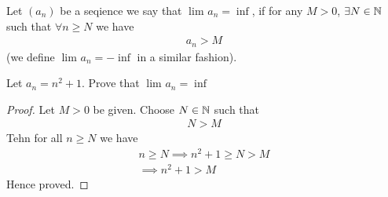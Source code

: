 \begin{definition}
	Let $\left( a_n \right) $ be a seqience we say that $\lim_{} a_n = \inf$, if for any $M > 0$, $\exists N \in  \mathbb{N}$ such that $\forall n \ge N$ we have
	\begin{align}
		a_n > M
	\end{align}
	(we define $\lim_{} a_n = -\inf$ in a similar fashion).
\end{definition}

\begin{eg}
	Let $a_n = n^{2} + 1$. Prove that $\lim_{} a_n = \inf$
\end{eg}

\begin{proof}
	Let $M > 0$ be given. Choose $N \in  \mathbb{N}$ such that
	\begin{align}
		N > M
	\end{align}
	Tehn for all $n \ge  N$ we have
	\begin{align}
		n \ge N \implies n^{2} + 1 \ge N > M \\
		\implies n^{2} + 1 > M
	\end{align}
	Hence proved.
\end{proof}










